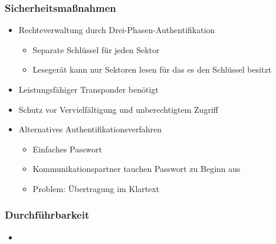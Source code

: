 \documentclass{beamer}
\begin{document}
\begin{frame}
\frametitle{Sicherheitsmaßnahmen}

\begin{itemize}
	\item Rechteverwaltung durch Drei-Phasen-Authentifikation
	\begin{itemize}
		\item Separate Schlüssel für jeden Sektor
		\item Lesegerät kann nur Sektoren lesen für das es den Schlüssel besitzt
	\end{itemize}
	\item Leistungsfähiger Transponder benötigt
	\item Schutz vor Vervielfältigung und unberechtigtem Zugriff
	
	\item Alternatives Authentifikationsverfahren
	\begin{itemize}
		\item Einfaches Passwort
		\item Kommunikationspartner tauchen Passwort zu Beginn aus
		\item Problem: Übertragung im Klartext
	\end{itemize}
\end{itemize}
\end{frame}


\begin{frame}
\frametitle{Durchführbarkeit}

\begin{itemize}
\item
\end{itemize}
\end{frame}


%
\end{document}
